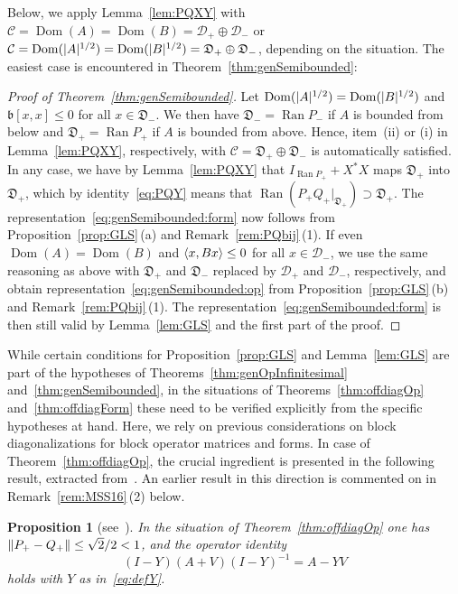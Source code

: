 \documentclass[11pt,a4paper]{amsart}
\numberwithin{equation}{section}
\DeclareMathOperator{\Ran}{Ran}
\DeclareMathOperator{\Dom}{Dom}
\DeclarePairedDelimiter{\abs}{|}{|}
\DeclarePairedDelimiter{\norm}{\lVert}{\rVert}
\DeclarePairedDelimiter{\scprod}{\langle}{\rangle}
\newcommand{\cC}{{\mathcal C}}
\newcommand{\cD}{{\mathcal D}}
\newcommand{\fb}{{\mathfrak b}}
\newcommand{\fD}{{\mathfrak D}}
\theoremstyle{plain}
\newtheorem{proposition}[theorem]{Proposition}
\theoremstyle{definition}
\theoremstyle{remark}
\begin{document}
Below, we apply Lemma~\ref{lem:PQXY} with $\cC = \Dom(A) = \Dom(B) = \cD_+ \oplus \cD_-$ or
$\cC = \Dom(\abs{A}^{1/2}) = \Dom(\abs{B}^{1/2}) = \fD_+ \oplus \fD_-$, depending on the situation. The easiest case is
encountered in Theorem~\ref{thm:genSemibounded}:

\begin{proof}[Proof of Theorem~\ref{thm:genSemibounded}]
  Let $\Dom(\abs{A}^{1/2}) = \Dom(\abs{B}^{1/2})$ and $\fb[x , x] \le 0$ for all $x \in \fD_-$. We then have $\fD_- = \Ran P_-$
  if $A$ is bounded from below and $\fD_+ = \Ran P_+$ if $A$ is bounded from above. Hence, item~(ii) or (i) in
  Lemma~\ref{lem:PQXY}, respectively, with $\cC = \fD_+ \oplus \fD_-$ is automatically satisfied. In any case, we have by
  Lemma~\ref{lem:PQXY} that $I_{\Ran P_+} + X^*X$ maps $\fD_+$ into $\fD_+$, which by identity~\eqref{eq:PQY} means that
  $\Ran (P_+Q_+|_{\fD_+}) \supset \fD_+$. The representation~\eqref{eq:genSemibounded:form} now follows from
  Proposition~\ref{prop:GLS}\,(a) and Remark~\ref{rem:PQbij}\,(1). If even $\Dom(A) = \Dom(B)$ and $\scprod{ x , Bx } \le 0$ for
  all $x \in \cD_-$, we use the same reasoning as above with $\fD_+$ and $\fD_-$ replaced by $\cD_+$ and $\cD_-$, respectively,
  and obtain representation~\eqref{eq:genSemibounded:op} from Proposition~\ref{prop:GLS}\,(b) and Remark~\ref{rem:PQbij}\,(1).
  The representation~\eqref{eq:genSemibounded:form} is then still valid by Lemma~\ref{lem:GLS} and the first part of the proof.
\end{proof}%

While certain conditions for Proposition~\ref{prop:GLS} and Lemma~\ref{lem:GLS} are part of the hypotheses of
Theorems~\ref{thm:genOpInfinitesimal} and~\ref{thm:genSemibounded}, in the situations of Theorems~\ref{thm:offdiagOp}
and~\ref{thm:offdiagForm} these need to be verified explicitly from the specific hypotheses at hand. Here, we rely on previous
considerations on block diagonalizations for block operator matrices and forms. In case of Theorem~\ref{thm:offdiagOp}, the
crucial ingredient is presented in the following result, extracted from~\cite{MSS16}. An earlier result in this direction is
commented on in Remark~\ref{rem:MSS16}\,(2) below.

\begin{proposition}[see~{\cite[Theorem~6.1]{MSS16}}]\label{prop:MSS16}
  In the situation of Theorem~\ref{thm:offdiagOp} one has $\norm{P_+-Q_+} \le \sqrt{2}/2 <1$, and the operator identity
  \begin{equation}\label{eq:blockDiag}
    (I-Y)(A+V)(I-Y)^{-1} = A-YV
  \end{equation}
  holds with $Y$ as in~\eqref{eq:defY}.
\end{proposition}
\end{document}
